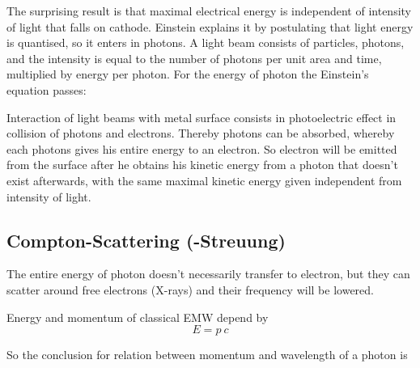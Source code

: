 \documentclass{report}
\begin{document}
The surprising result is that maximal electrical energy is independent of intensity of light that falls on cathode. Einstein explains it by postulating that light energy is quantised, so it enters in photons. A light beam consists of particles, photons, and the intensity is equal to the number of photons per unit area and time, multiplied by energy per photon. For the energy of photon the Einstein's equation passes:


Interaction of light beams with metal surface consists in photoelectric effect in collision of photons and electrons. Thereby photons can be absorbed, whereby each photons gives his entire energy to an electron. So electron will be emitted from the surface after he obtains his kinetic energy from a photon that doesn't exist afterwards, with the same maximal kinetic energy given independent from intensity of light.


\subsection{Compton-Scattering (-Streuung)}
The entire energy of photon doesn't necessarily transfer to electron, but they can scatter around free electrons (X-rays) and their frequency will be lowered.

Energy and momentum of classical EMW depend by
\begin{equation}
    E = p \ c
\end{equation}

So the conclusion for relation between momentum and wavelength of a photon is
\end{document}
